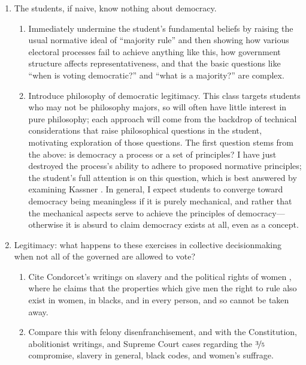 \begin{enumerate}

    \item The students, if naive, know nothing about democracy.
    \begin{enumerate}
        \item \technical Immediately undermine the student's fundamental beliefs by raising the usual normative ideal of ``majority rule'' and then showing how various electoral processes fail to achieve anything like this, how government structure affects representativeness, and that the basic questions like ``when is voting democratic?'' and ``what is a majority?'' are complex.

        \item \philosophical Introduce philosophy of democratic legitimacy.  This class targets students who may not be philosophy majors, so will often have little interest in pure philosophy; each approach will come from the backdrop of technical considerations that raise philosophical questions in the student, motivating exploration of those questions.  The first question stems from the above:  is democracy a process or a set of principles?  I have just destroyed the process's ability to adhere to proposed normative principles; the student's full attention is on this question, which is best answered by examining Kassner \autocite{Kassner2006}.  In general, I expect students to converge toward democracy being meaningless if it is purely mechanical, and rather that the mechanical aspects serve to achieve the principles of democracy—otherwise it is absurd to claim democracy exists at all, even as a concept.
    \end{enumerate}

    \item Legitimacy:  what happens to these exercises in collective decisionmaking when not all of the governed are allowed to vote?
    \begin{enumerate}
        \item \philosophical Cite Condorcet's writings on slavery and the political rights of women \autocite{Condorcet1781,Condorcet1789}, where he claims that the properties which give men the right to rule also exist in women, in blacks, and in every person, and so cannot be taken away.

        \item \philosophical Compare this with felony disenfranchisement, and with the Constitution, abolitionist writings, and Supreme Court cases regarding the $\nicefrac{3}{5}$ compromise, slavery in general, black codes, and women's suffrage.


\end{enumerate}
\end{enumerate}

